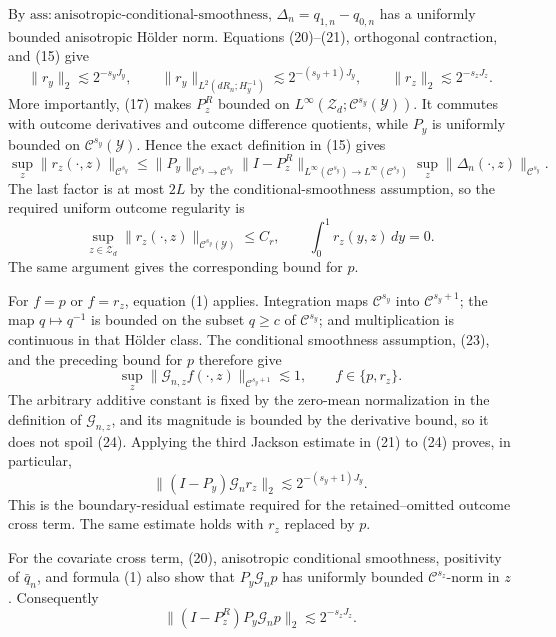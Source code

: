 By \(\mathrm{ass{:}anisotropic\text{-}conditional\text{-}smoothness}\), \(\Delta_n=q_{1,n}-q_{0,n}\) has a uniformly bounded anisotropic H\"older norm.  Equations (20)--(21), orthogonal contraction, and (15) give
\[
 \|r_y\|_2\lesssim2^{-s_yJ_y},
 \qquad \|r_y\|_{L^2(dR_n;H_y^{-1})}\lesssim2^{-(s_y+1)J_y},
 \qquad \|r_z\|_2\lesssim2^{-s_zJ_z}. \tag{22}
\]
More importantly, (17) makes \(P_z^R\) bounded on \(L^\infty(\mathcal Z_d;\mathcal C^{s_y}(\mathcal Y))\).  It commutes with outcome derivatives and outcome difference quotients, while \(P_y\) is uniformly bounded on \(\mathcal C^{s_y}(\mathcal Y)\).  Hence the exact definition in (15) gives
\[
 \sup_z\|r_z(\cdot,z)\|_{\mathcal C^{s_y}}
 \leq \|P_y\|_{\mathcal C^{s_y}\to\mathcal C^{s_y}}
 \|I-P_z^R\|_{L^\infty(\mathcal C^{s_y})\to L^\infty(\mathcal C^{s_y})}
 \sup_z\|\Delta_n(\cdot,z)\|_{\mathcal C^{s_y}}.
\]
The last factor is at most \(2L\) by the conditional-smoothness assumption, so the required uniform outcome regularity is
\[
 \sup_{z\in\mathcal Z_d}\|r_z(\cdot,z)\|_{\mathcal C^{s_y}(\mathcal Y)}
 \leq C_r,
 \qquad \int_0^1r_z(y,z)\,dy=0. \tag{23}
\]
The same argument gives the corresponding bound for \(p\).

For \(f=p\) or \(f=r_z\), equation (1) applies.  Integration maps \(\mathcal C^{s_y}\) into \(\mathcal C^{s_y+1}\); the map \(q\mapsto q^{-1}\) is bounded on the subset \(q\geq c\) of \(\mathcal C^{s_y}\); and multiplication is continuous in that H\"older class.  The conditional smoothness assumption, (23), and the preceding bound for \(p\) therefore give
\[
 \sup_z\|\mathcal G_{n,z}f(\cdot,z)\|_{\mathcal C^{s_y+1}}
 \lesssim1,
 \qquad f\in\{p,r_z\}. \tag{24}
\]
The arbitrary additive constant is fixed by the zero-mean normalization in the definition of \(\mathcal G_{n,z}\), and its magnitude is bounded by the derivative bound, so it does not spoil (24).  Applying the third Jackson estimate in (21) to (24) proves, in particular,
\[
 \|(I-P_y)\mathcal G_nr_z\|_2
 \lesssim2^{-(s_y+1)J_y}. \tag{25}
\]
This is the boundary-residual estimate required for the retained--omitted outcome cross term.  The same estimate holds with \(r_z\) replaced by \(p\).

For the covariate cross term, (20), anisotropic conditional smoothness, positivity of \(\bar q_n\), and formula (1) also show that \(P_y\mathcal G_np\) has uniformly bounded \(\mathcal C^{s_z}\)-norm in \(z\).  Consequently
\[
 \|(I-P_z^R)P_y\mathcal G_np\|_2\lesssim2^{-s_zJ_z}. \tag{26}
\]


